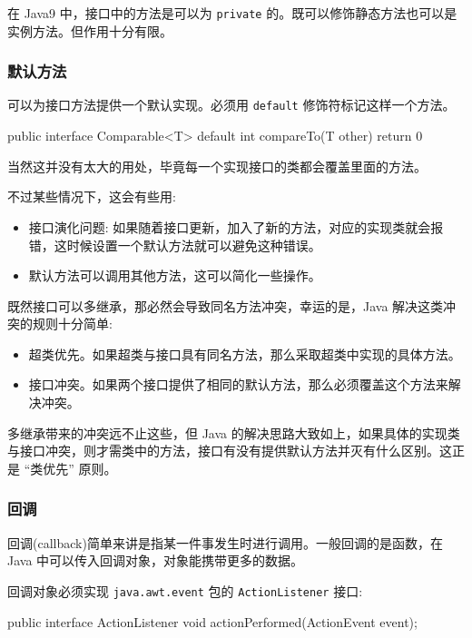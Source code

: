 在 Java9 中，接口中的方法是可以为 \texttt{private} 的。既可以修饰静态方法也可以是实例方法。但作用十分有限。

\subsubsection{默认方法}

可以为接口方法提供一个默认实现。必须用 \texttt{default} 修饰符标记这样一个方法。

\begin{Java}
public interface Comparable<T> {
    default int compareTo(T other) {
        return 0
    }
}
\end{Java}

当然这并没有太大的用处，毕竟每一个实现接口的类都会覆盖里面的方法。

不过某些情况下，这会有些用:
\begin{itemize}
    \item 接口演化问题: 如果随着接口更新，加入了新的方法，对应的实现类就会报错，这时候设置一个默认方法就可以避免这种错误。
    \item 默认方法可以调用其他方法，这可以简化一些操作。
\end{itemize}

既然接口可以多继承，那必然会导致同名方法冲突，幸运的是，Java 解决这类冲突的规则十分简单:
\begin{itemize}
    \item 超类优先。如果超类与接口具有同名方法，那么采取超类中实现的具体方法。
    \item 接口冲突。如果两个接口提供了相同的默认方法，那么必须覆盖这个方法来解决冲突。
\end{itemize}

多继承带来的冲突远不止这些，但 Java 的解决思路大致如上，如果具体的实现类与接口冲突，则才需类中的方法，接口有没有提供默认方法并灭有什么区别。这正是 ``类优先'' 原则。

\subsubsection{回调}

回调(callback)简单来讲是指某一件事发生时进行调用。一般回调的是函数，在 Java 中可以传入回调对象，对象能携带更多的数据。

回调对象必须实现 \texttt{java.awt.event} 包的 \texttt{ActionListener} 接口:

\begin{Java}
public interface ActionListener {
    void actionPerformed(ActionEvent event);
}
\end{Java}

